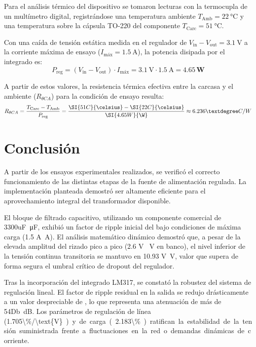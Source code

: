 \documentclass[12pt,a4paper]{article}
\begin{document}
Para el análisis térmico del dispositivo se tomaron lecturas con la termocupla de un multímetro digital, registrándose una temperatura ambiente $T_{\text{Amb}} = \SI{22}{\celsius}$ y una temperatura sobre la cápsula TO-220 del componente $T_{\text{Carc}} = \SI{51}{\celsius}$. 

Con una caída de tensión estática medida en el regulador de $V_{\text{in}} - V_{\text{out}} = \SI{3.1}{\V}$ a la corriente máxima de ensayo ($I_{\text{máx}} = \SI{1.5}{\A}$), la potencia disipada por el integrado es:
\begin{equation}
    P_{\text{reg}} = (V_{\text{in}} - V_{\text{out}}) \cdot I_{\text{máx}} = \SI{3.1}{\V} \cdot \SI{1.5}{\A} = \mathbf{4.65\,\text{W}}
\end{equation}

A partir de estos valores, la resistencia térmica efectiva entre la carcasa y el ambiente ($R_{\theta CA}$) para la condición de ensayo resulta:
\begin{equation}
    R_{\theta CA} = \frac{T_{\text{Carc}} - T_{\text{Amb}}}{P_{\text{reg}}} = \frac{\SI{51 C}{\celsius} - \SI{22 C}{\celsius}}{\SI{4.65 W}{\W}} \approx {6.236 °C/W}
\end{equation}

\section{Conclusión}
A partir de los ensayos experimentales realizados, se verificó el correcto funcionamiento de las distintas etapas de la fuente de alimentación regulada. La implementación planteada demostró ser altamente eficiente para el aprovechamiento integral del transformador disponible. 

El bloque de filtrado capacitivo, utilizando un componente comercial de \SI{3300uF}{\micro\F}, exhibió un factor de ripple inicial del  bajo condiciones de máxima carga (\SI{1.5 A}{\A}). El análisis matemático dinámico demostró que, a pesar de la elevada amplitud del rizado pico a pico (\SI{2.6 V }{\V} en banco), el nivel inferior de la tensión continua transitoria se mantuvo en \SI{10.93 V}{\V}, valor que supera de forma segura el umbral crítico de dropout del regulador.

Tras la incorporación del integrado LM317, se constató la robustez del sistema de regulación lineal. El factor de ripple residual en la salida se redujo drásticamente a un valor despreciable de , lo que representa una atenuación de más de \SI{54Db}{\dB}. Los parámetros de regulación de línea (\SI{1.705\%/\text{V}}) y de carga (\SI{2.183\%}) ratifican la estabilidad de la tensión suministrada frente a fluctuaciones en la red o demandas dinámicas de corriente. 
\end{document}
